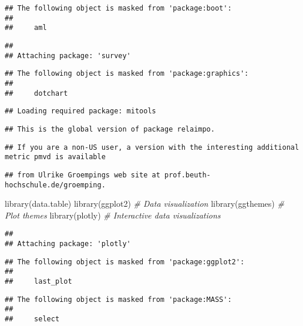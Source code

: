 \documentclass[
]{article}
\newenvironment{Shaded}{\begin{snugshade}}{\end{snugshade}}
\newcommand{\CommentTok}[1]{\textcolor[rgb]{0.56,0.35,0.01}{\textit{#1}}}
\newcommand{\FunctionTok}[1]{\textcolor[rgb]{0.00,0.00,0.00}{#1}}
\newcommand{\NormalTok}[1]{#1}
\begin{document}
\begin{verbatim}
## The following object is masked from 'package:boot':
## 
##     aml
\end{verbatim}

\begin{verbatim}
## 
## Attaching package: 'survey'
\end{verbatim}

\begin{verbatim}
## The following object is masked from 'package:graphics':
## 
##     dotchart
\end{verbatim}

\begin{verbatim}
## Loading required package: mitools
\end{verbatim}

\begin{verbatim}
## This is the global version of package relaimpo.
\end{verbatim}

\begin{verbatim}
## If you are a non-US user, a version with the interesting additional metric pmvd is available
\end{verbatim}

\begin{verbatim}
## from Ulrike Groempings web site at prof.beuth-hochschule.de/groemping.
\end{verbatim}

\begin{Shaded}
\begin{Highlighting}[]
\FunctionTok{library}\NormalTok{(data.table)}
\FunctionTok{library}\NormalTok{(ggplot2) }\CommentTok{\# Data visualization}
\FunctionTok{library}\NormalTok{(ggthemes) }\CommentTok{\# Plot themes}
\FunctionTok{library}\NormalTok{(plotly) }\CommentTok{\# Interactive data visualizations}
\end{Highlighting}
\end{Shaded}

\begin{verbatim}
## 
## Attaching package: 'plotly'
\end{verbatim}

\begin{verbatim}
## The following object is masked from 'package:ggplot2':
## 
##     last_plot
\end{verbatim}

\begin{verbatim}
## The following object is masked from 'package:MASS':
## 
##     select
\end{verbatim}
\end{document}
